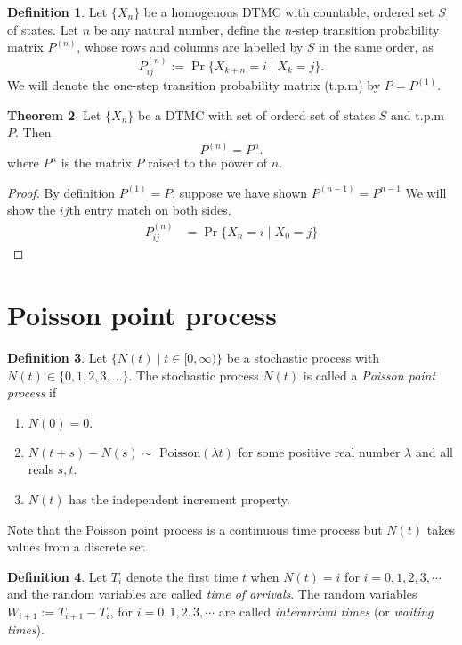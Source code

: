 \documentclass[letterpaper, 12pt]{article}
\newcommand{\1}{\mathds{1}} %
\theoremstyle{definition}
\newtheorem{theorem}{Theorem}[section]
\newtheorem{definition}[theorem]{Definition}
\begin{document}
\begin{definition}
\label{defn:probDTMC}
Let $\{X_n\}$ be a homogenous DTMC with countable, ordered set $S$ of states. Let $n$ be any natural number, define the $n$-step transition probability matrix $P^{(n)}$, whose rows and columns are labelled by $S$ in the same order, as\[P^{(n)}_{ij} := \Pr\{X_{k+n}=i \mid X_k=j\}.\] We will denote the one-step transition probability matrix (t.p.m) by $P=P^{(1)}$.
\end{definition}

\begin{theorem}
  \label{thm:CK}
  Let $\{X_n\}$ be a DTMC with set of orderd set of states $S$ and t.p.m $P$. Then 
                      \[P^{(n)}=P^n.\] where $P^n$ is the matrix $P$ raised to the power of $n$.
\end{theorem}
\begin{proof}
  By definition $P^{(1)}=P$, suppose we have shown $P^{(n-1)} = P^{n-1}$
  We will show the $ij$th entry match on both sides.
  \begin{align*}
  P^{(n)}_{ij} &= \Pr\{X_{n}=i \mid X_0=j\} 
  \end{align*}
\end{proof}
\newpage

\section{Poisson point process}
\label{sec:PP}

\begin{definition}
    \label{def:PoissonProcess}
   Let $\{N(t) \mid t \in [0,\infty)\}$ be a stochastic process with $N(t) \in \{0,1,2,3,\ldots\}$. The stochastic process $N(t)$ is called a \emph{Poisson point process} if 
   \begin{enumerate}
   \item $N(0)=0.$
   \item $N(t+s)-N(s)\sim \text{ Poisson}(\lambda t)$ for some positive real number $\lambda$ and all reals $s,t$.
   \item $N(t)$ has the independent increment property.
   \end{enumerate}
\end{definition}

Note that the Poisson point process is a continuous time process but $N(t)$ takes values from a discrete set.

\begin{definition}
\label{def:poissterms}
Let $T_i$ denote the first time $t$ when $N(t)=i$ for $i=0,1,2,3,\cdots$ and the random variables are called \emph{time of arrivals}. The random variables $W_{i+1} := T_{i+1} - T_{i}$, for $i=0,1,2,3,\cdots$ are called \emph{interarrival times} (or \emph{waiting times}). 
\end{definition}
\end{document}
